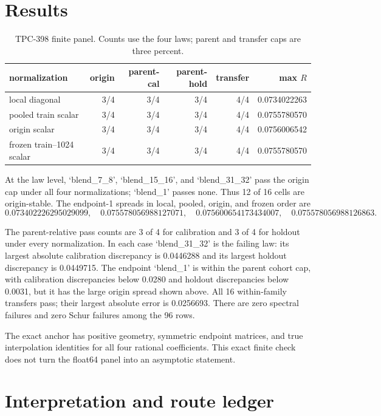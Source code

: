 \documentclass[10pt]{article}
\begin{document}
\section{Results}

\begin{table}[t]
\centering
\caption{TPC-398 finite panel.  Counts use the four laws; parent and transfer
 caps are three percent.}
\label{tab:summary}
\small
\begin{tabular}{@{}lrrrrr@{}}
\toprule
normalization & origin & parent-cal & parent-hold & transfer & max \(R\)\\
\midrule
local diagonal & 3/4 & 3/4 & 3/4 & 4/4 & 0.0734022263\\
pooled train scalar & 3/4 & 3/4 & 3/4 & 4/4 & 0.0755780570\\
origin scalar & 3/4 & 3/4 & 3/4 & 4/4 & 0.0756006542\\
frozen train--1024 scalar & 3/4 & 3/4 & 3/4 & 4/4 & 0.0755780570\\
\bottomrule
\end{tabular}
\end{table}

At the law level, `blend\_7\_8', `blend\_15\_16', and `blend\_31\_32'
pass the origin cap under all four normalizations; `blend\_1' passes none.
Thus 12 of 16 cells are origin-stable.  The endpoint-1 spreads in local,
pooled, origin, and frozen order are
\[
0.073402226295029099,\quad
0.075578056988127071,\quad
0.075600654173434007,\quad
0.075578056988126863.
\]

The parent-relative pass counts are 3 of 4 for calibration and 3 of 4 for
holdout under every normalization.  In each case `blend\_31\_32' is the
failing law: its largest absolute calibration discrepancy is 0.0446288 and
its largest holdout discrepancy is 0.0449715.  The endpoint `blend\_1' is
within the parent cohort cap, with calibration discrepancies below 0.0280 and
holdout discrepancies below 0.0031, but it has the large origin spread shown
above.  All 16 within-family transfers pass; their largest absolute error is
0.0256693.  There are zero spectral failures and zero Schur failures among
the 96 rows.

The exact anchor has positive geometry, symmetric endpoint matrices, and true
interpolation identities for all four rational coefficients.  This exact
finite check does not turn the float64 panel into an asymptotic statement.

\section{Interpretation and route ledger}
\end{document}
